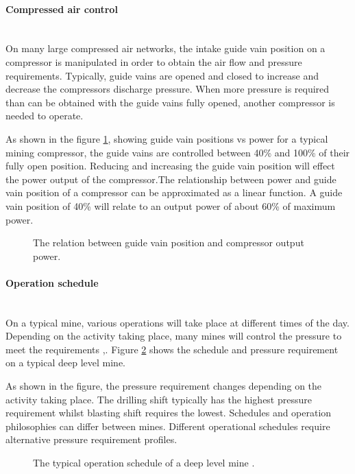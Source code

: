 			\paragraph{Compressed air control}\leavevmode\\
				On many large compressed air networks, the intake guide vain position on a compressor is manipulated in order to obtain the air flow and pressure requirements. Typically, guide vains are opened and closed to increase and decrease the compressors discharge pressure. When more pressure is required than can be obtained with the guide vains fully opened, another compressor is needed to operate.\par
				As shown in the figure \ref{fig: Guide vain position}, showing guide vain positions vs power for a typical mining compressor, the guide vains are controlled between 40\% and 100\% of their fully open position. Reducing and increasing the guide vain position will effect the power output of the compressor.The relationship between power and guide vain position of a compressor can be approximated as a linear function. A guide vain position of 40\% will relate to an output power of about 60\% of maximum power.
				\begin{figure}[h]
					\centering
					\fbox{}
					\caption[The relation between guide vain position and compressor output power.]{The relation between guide vain position and compressor output power.}
					\label{fig: Guide vain position}
				\end{figure}
			\paragraph{Operation schedule}\leavevmode\\
				On a typical mine, various operations will take place at different times of the day. Depending on the activity taking place, many mines will control the pressure to meet the requirements \cite{Kriel2014Masters},\cite{Marais2012PhD}. Figure \ref{fig: Mining schedule} shows the schedule and pressure requirement on a typical deep level mine.\par 
				As shown in the figure, the pressure requirement changes depending on the activity taking place. The drilling shift typically has the highest pressure requirement whilst blasting shift requires the lowest. Schedules and operation philosophies can differ between mines. Different operational schedules require alternative pressure requirement profiles.
				\begin{figure}[h]
					\centering
					\fbox{}
					\caption[A typical operation schedule of a deep level mine.]{The typical operation schedule of a deep level mine \cite{Kriel2014Masters}.}
					\label{fig: Mining schedule}
				\end{figure}
